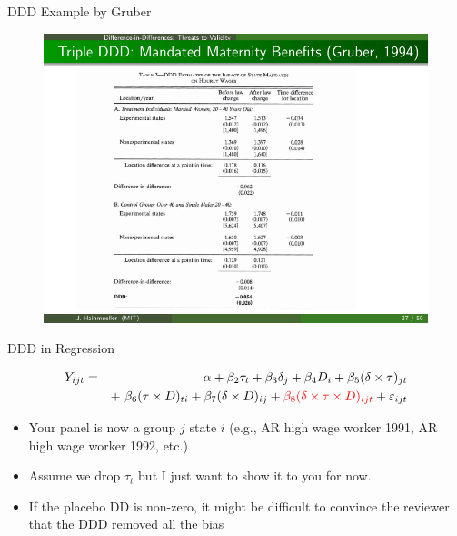 \documentclass{beamer}
\begin{document}
\begin{frame}{DDD Example by Gruber}
	
	\begin{figure}
	\includegraphics{./lecture_includes/gruber_ddd_3.pdf}
	\end{figure}
	
\end{frame}

\begin{frame}{DDD in Regression}
	
	\begin{eqnarray*}
	Y_{ijt} &=&\alpha +  \beta_2 \tau_t + \beta_3 \delta_j  + \beta_4 D_i + \beta_5(\delta \times \tau)_{jt} \\
	&& +\ \beta_6(\tau \times D)_{ti} +  \beta_7(\delta \times D)_{ij} +  \textcolor{red}{\beta_8(\delta \times \tau \times  D)_{ijt}}+  \varepsilon_{ijt}
	\end{eqnarray*}
	
	\begin{itemize}
	\item Your panel is now a group $j$ state $i$ (e.g., AR high wage worker 1991, AR high wage worker 1992, etc.)
	\item Assume we drop $\tau_t$ but I just want to show it to you for now.
	\item If the placebo DD is non-zero, it might be difficult to convince the reviewer that the DDD removed all the bias 
	\end{itemize}
	
\end{frame}
\end{document}
